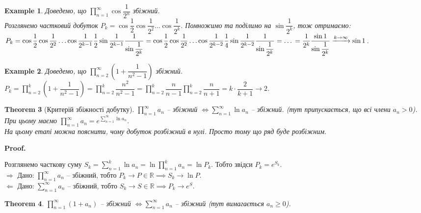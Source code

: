 \documentclass[a4paper, 10pt]{article}
\makeatletter
\def\rightproof{$\boxed{\Rightarrow}$ }
\def\leftproof{$\boxed{\Leftarrow}$ }
\theoremstyle{theoremdd}
\newtheorem{theorem}{Theorem}[subsection]
\theoremstyle{theoremdd}
\theoremstyle{theoremdd}
\theoremstyle{theoremdd}
\theoremstyle{theoremdd}
\newtheorem{example}[theorem]{Example}
\theoremstyle{theoremdd}
\theoremstyle{theoremdd}
\theoremstyle{theoremdd}
\theoremstyle{theoremdd}
\renewenvironment{proof}[1][Proof.\\]{\par
\pushQED{\hfill \qed}%
\normalfont \topsep6\p@\@plus6\p@\relax
\trivlist
\item\relax
{\bfseries
#1\@addpunct{.}}\hspace\labelsep\ignorespaces
}{%
\popQED\endtrivlist\@endpefalse
}
\makeatother
\begin{document}
\begin{example}
Доведемо, що $\displaystyle\prod_{n=1}^\infty \cos \dfrac{1}{2^n}$ збіжний.\\
Розглянемо частковий добуток $P_k = \cos \dfrac{1}{2} \cos \dfrac{1}{2^2} \dots \cos \dfrac{1}{2^k}$. Помножимо та поділимо на $\sin \dfrac{1}{2^k}$, тож отримаємо:\\
$P_k = \cos \dfrac{1}{2} \cos \dfrac{1}{2^2} \dots \cos \dfrac{1}{2^{k-1}} \dfrac{1}{2} \sin \dfrac{1}{2^{k-1}} \dfrac{1}{\sin \dfrac{1}{2^k}} = \cos \dfrac{1}{2} \cos \dfrac{1}{2^2} \dots \cos \dfrac{1}{2^{k-2}} \dfrac{1}{4} \sin \dfrac{1}{2^{k-2}} \dfrac{1}{\sin \dfrac{1}{2^k}} = \dots \\
= \dfrac{1}{2^k} \dfrac{\sin 1}{\sin \dfrac{1}{2^k}} \xrightarrow{k \to \infty} \sin 1$.
\end{example}

\begin{example}
Доведемо, що $\displaystyle\prod_{n=2}^\infty \left(1 + \dfrac{1}{n^2-1} \right)$ збіжний.\\
$P_k = \displaystyle\prod_{n=2}^k \left( 1 + \dfrac{1}{n^2-1} \right) = \prod_{n=2}^k \dfrac{n^2}{n^2-1} = \prod_{n=2}^k \dfrac{n}{n-1} \prod_{n=2}^k \dfrac{n}{n+1} = k \cdot \dfrac{2}{k+1} \to 2$.
\end{example}

\begin{theorem}[Критерій збіжності добутку]
$\displaystyle\prod_{n=1}^\infty a_n$ -- збіжний $\iff \displaystyle\sum_{n=1}^\infty \ln a_n$ -- збіжний. (тут припускається, що всі члени $a_n > 0$).\\
При цьому маємо $\displaystyle\prod_{n=1}^\infty a_n = e^{\sum_{n=1}^\infty \ln a_n}$.\\
\textit{На цьому етапі можна пояснити, чому добуток розбіжний в нулі. Просто тому що ряд буде розбіжним.}
\end{theorem}

\begin{proof}
Розглянемо часткову суму $S_k = \displaystyle\sum_{n=1}^k \ln a_n = \ln \prod_{n=1}^k a_n = \ln P_k$. Тобто звідси $P_k = e^{S_k}$.\\
\rightproof Дано: $\displaystyle\prod_{n=1}^\infty a_n$ -- збіжний, тобто $P_k \to P \in \mathbb{R} \implies S_k \to \ln P$.\\
\leftproof Дано: $\displaystyle\sum_{n=1}^\infty a_n$ -- збіжний, тобто $S_k \to S \in \mathbb{R} \implies P_k \to e^S$.
\end{proof}

\begin{theorem}
$\displaystyle\prod_{n=1}^\infty (1+a_n)$ -- збіжний $\iff \displaystyle\sum_{n=1}^\infty a_n$ -- збіжний (тут вимагається $a_n \geq 0$).
\end{theorem}
\end{document}
